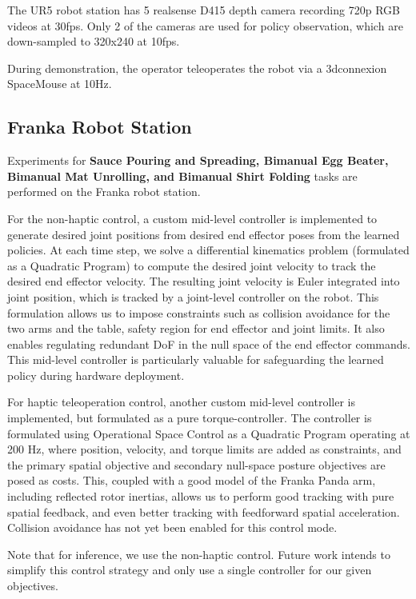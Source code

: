 The UR5 robot station has 5 realsense D415 depth camera recording 720p RGB videos at 30fps. Only 2 of the cameras are used for policy observation, which are down-sampled to 320x240 at 10fps.

During demonstration, the operator teleoperates the robot via a 3dconnexion SpaceMouse at 10Hz.

\subsection{Franka Robot Station}
\label{sec:franka_setup}
Experiments for \textbf{Sauce Pouring and Spreading, Bimanual Egg Beater, Bimanual Mat Unrolling, and
Bimanual Shirt Folding} tasks are performed on the Franka robot station. 

For the non-haptic control, a custom mid-level controller is implemented to generate desired joint positions from desired end effector poses from the learned policies. At each time step, we solve a differential kinematics problem (formulated as a Quadratic Program) to compute the desired joint velocity to track the desired end effector velocity. The resulting joint velocity is Euler integrated into joint position, which is tracked by a joint-level controller on the robot. This formulation allows us to impose constraints such as collision avoidance for the two arms and the table, safety region for end effector and joint limits. It also enables regulating redundant DoF in the null space of the end effector commands. This mid-level controller is particularly valuable for safeguarding the learned policy during hardware deployment. 


For haptic teleoperation control, another custom mid-level controller is implemented, but formulated as a pure torque-controller. The controller is formulated using Operational Space Control \citet{khatib1987osc} as a Quadratic Program operating at 200 Hz, where position, velocity, and torque limits are added as constraints, and the primary spatial objective and secondary null-space posture objectives are posed as costs.
This, coupled with a good model of the Franka Panda arm, including reflected rotor inertias, allows us to perform
good tracking with pure spatial feedback, and even better tracking with feedforward spatial acceleration.
Collision avoidance has not yet been enabled for this control mode.

Note that for inference, we use the non-haptic control. Future work intends to simplify
this control strategy and only use a single controller for our given objectives.

